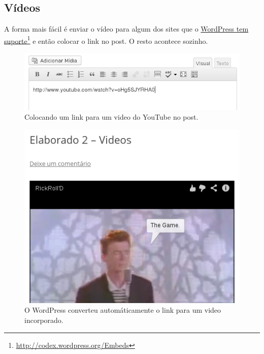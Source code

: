 \documentclass[12pt,onecolumn]{article}
\begin{document}
	\subsection{Vídeos}
		A forma mais fácil é enviar o vídeo para algum dos sites que o 
		\href{http://codex.wordpress.org/Embeds}{WordPress tem suporte}\footnote{\url{http://codex.wordpress.org/Embeds}} e 
		então colocar o link no post. O resto acontece sozinho.
		\begin{figure}[H]
			\centering
			\includegraphics{video1.png}
			\caption{Colocando um link para um video do YouTube no post.}
		\end{figure}
		\begin{figure}[H]
			\centering
			\includegraphics{video2.png}
			\caption{O WordPress converteu automáticamente o link para um video incorporado.}
		\end{figure}
\end{document}
